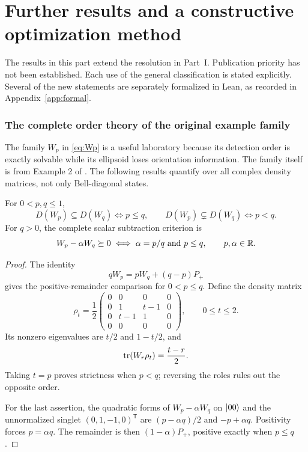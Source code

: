 \part{Further results and a constructive optimization method}

The results in this part extend the resolution in Part~I. Publication priority has not been established. Each use of the general classification is stated explicitly. Several of the new statements are separately formalized in Lean, as recorded in Appendix~\ref{app:formal}.

\section{The complete order theory of the original example family}

The family $W_p$ in \eqref{eq:Wp} is a useful laboratory because its detection order is exactly solvable while its ellipsoid loses orientation information. The family itself is from Example 2 of \cite{milne}. The following results quantify over all complex density matrices, not only Bell-diagonal states.

\begin{theorem}\label{thm:parametric-order}
For $0<p,q\leq1$,
\[
 D(W_p)\subseteq D(W_q)\iff p\leq q,
 \qquad D(W_p)\subsetneq D(W_q)\iff p<q.
\]
For $q>0$, the complete scalar subtraction criterion is
\[
 W_p-\alpha W_q\succeq0
 \iff \alpha=p/q\ \text{and}\ p\leq q,
 \qquad p,\alpha\in\mathbb R.
\]
\end{theorem}
\begin{proof}
The identity
\[
 qW_p=pW_q+(q-p)P_+
\]
gives the positive-remainder comparison for $0<p\leq q$. Define the density matrix
\[
 \rho_t=\frac12\begin{pmatrix}
 0&0&0&0\\0&1&t-1&0\\0&t-1&1&0\\0&0&0&0
 \end{pmatrix},\qquad 0\leq t\leq2.
\]
Its nonzero eigenvalues are $t/2$ and $1-t/2$, and
\begin{equation}\label{eq:universal-separator}
 \operatorname{tr}(W_r\rho_t)=\frac{t-r}{2}.
\end{equation}
Taking $t=p$ proves strictness when $p<q$; reversing the roles rules out the opposite order.

For the last assertion, the quadratic forms of $W_p-\alpha W_q$ on $\lvert 00\rangle$ and the unnormalized singlet $(0,1,-1,0)^{\mathsf T}$ are $(p-\alpha q)/2$ and $-p+\alpha q$. Positivity forces $p=\alpha q$. The remainder is then $(1-\alpha)P_+$, positive exactly when $p\leq q$.
\end{proof}

